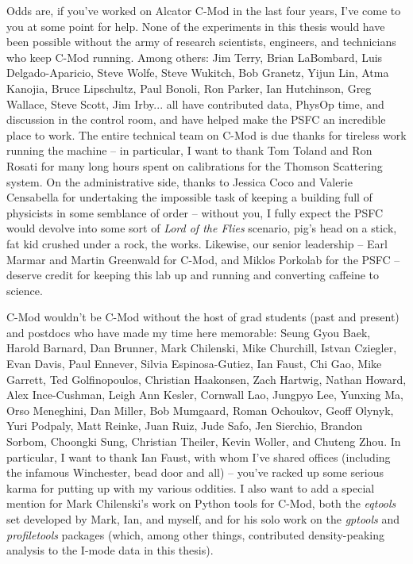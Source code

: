 Odds are, if you've worked on Alcator C-Mod in the last four years, I've come to you at some point for help.  None of the experiments in this thesis would have been possible without the army of research scientists, engineers, and technicians who keep C-Mod running.  Among others: Jim Terry, Brian LaBombard, Luis Delgado-Aparicio, Steve Wolfe, Steve Wukitch, Bob Granetz, Yijun Lin, Atma Kanojia, Bruce Lipschultz, Paul Bonoli, Ron Parker, Ian Hutchinson, Greg Wallace, Steve Scott, Jim Irby... all have contributed data, PhysOp time, and discussion in the control room, and have helped make the PSFC an incredible place to work.  The entire technical team on C-Mod is due thanks for tireless work running the machine -- in particular, I want to thank Tom Toland and Ron Rosati for many long hours spent on calibrations for the Thomson Scattering system.  On the administrative side, thanks to Jessica Coco and Valerie Censabella for undertaking the impossible task of keeping a building full of physicists in some semblance of order -- without you, I fully expect the PSFC would devolve into some sort of \emph{Lord of the Flies} scenario, pig's head on a stick, fat kid crushed under a rock, the works.  Likewise, our senior leadership -- Earl Marmar and Martin Greenwald for C-Mod, and Miklos Porkolab for the PSFC -- deserve credit for keeping this lab up and running and converting caffeine to science.

C-Mod wouldn't be C-Mod without the host of grad students (past and present) and postdocs who have made my time here memorable: Seung Gyou Baek, Harold Barnard, Dan Brunner, Mark Chilenski, Mike Churchill, Istvan Cziegler, Evan Davis, Paul Ennever, Silvia Espinosa-Gutiez, Ian Faust, Chi Gao, Mike Garrett, Ted Golfinopoulos, Christian Haakonsen, Zach Hartwig, Nathan Howard, Alex Ince-Cushman, Leigh Ann Kesler, Cornwall Lao, Jungpyo Lee, Yunxing Ma, Orso Meneghini, Dan Miller, Bob Mumgaard, Roman Ochoukov, Geoff Olynyk, Yuri Podpaly, Matt Reinke, Juan Ruiz, Jude Safo, Jen Sierchio, Brandon Sorbom, Choongki Sung, Christian Theiler, Kevin Woller, and Chuteng Zhou.  In particular, I want to thank Ian Faust, with whom I've shared offices (including the infamous Winchester, bead door and all) -- you've racked up some serious karma for putting up with my various oddities.  I also want to add a special mention for Mark Chilenski's work on Python tools for C-Mod, both the \emph{eqtools} set developed by Mark, Ian, and myself, and for his solo work on the \emph{gptools} and \emph{profiletools} packages (which, among other things, contributed density-peaking analysis to the I-mode data in this thesis).

